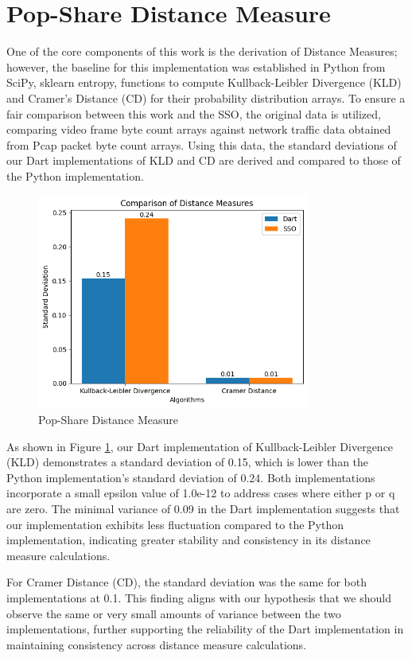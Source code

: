 \section{Pop-Share Distance Measure}
One of the core components of this work is the derivation of Distance Measures; however, the baseline for this implementation was established in Python from SciPy, sklearn entropy, functions to compute Kullback-Leibler Divergence (KLD) and Cramer’s Distance (CD) for their probability distribution arrays. To ensure a fair comparison between this work and the SSO, the original data is utilized, comparing video frame byte count arrays against network traffic data obtained from Pcap packet byte count arrays. Using this data, the standard deviations of our Dart implementations of KLD and CD are derived and compared to those of the Python implementation.

\begin{figure}[ht]
    \centering
    \includegraphics[width=0.8\textwidth]{5 Results/5.2 Bar Chart.png}
    \caption{Pop-Share Distance Measure}
    \label{fig:pop-share-distance-measure}
\end{figure}

As shown in Figure \ref{fig:pop-share-distance-measure}, our Dart implementation of Kullback-Leibler Divergence (KLD) demonstrates a standard deviation of 0.15, which is lower than the Python implementation’s standard deviation of 0.24. Both implementations incorporate a small epsilon value of 1.0e-12 to address cases where either p or q are zero. The minimal variance of 0.09 in the Dart implementation suggests that our implementation exhibits less fluctuation compared to the Python implementation, indicating greater stability and consistency in its distance measure calculations.

For Cramer Distance (CD), the standard deviation was the same for both implementations at 0.1. This finding aligns with our hypothesis that we should observe the same or very small amounts of variance between the two implementations, further supporting the reliability of the Dart implementation in maintaining consistency across distance measure calculations.
